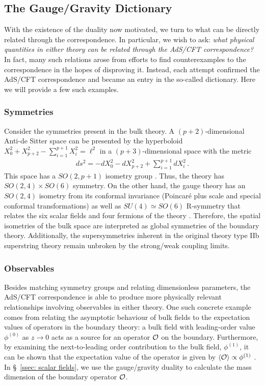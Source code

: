 \documentclass[../PhD.tex]{subfiles}
\begin{document}

\subsection{The Gauge/Gravity Dictionary}
\label{ssec: dictionary}

With the existence of the duality now motivated, we turn to what can be directly related through the correspondence. In particular, we wish to ask: \emph{what physical quantities in either theory can be related through the AdS/CFT correspondence?} In fact, many such relations arose from efforts to find counterexamples to the correspondence in the hopes of disproving it. Instead, each attempt confirmed the AdS/CFT correspondence and became an entry in the so-called dictionary. Here we will provide a few such examples.

\subsubsection*{Symmetries}
Consider the symmetries present in the \ads bulk theory. A $(p+2)$-dimensional Anti-de Sitter space can be presented by the hyperboloid $X_0^2 + X^2_{p+2} - \sum^{p+1}_{i=1} X_i^2 = \ell^2$ in a $(p+3)$-dimensional space with the metric
\begin{align}
\label{ads hyperboloid}
ds^2 = -dX_0^2 - dX_{p+2}^2 + \sum^{p+1}_{i = 1} dX^2_i \, .
\end{align}
This space has a $SO(2,p+1)$ isometry group \cite{hep-th/9905111}. Thus, the \ads theory has $SO(2,4)\times SO(6)$ symmetry. On the other hand, the gauge theory has an $SO(2,4)$ isometry from its conformal invariance (Poincar\'e plus scale and special conformal transformations) as well as $SU(4) \simeq SO(6)$ R-symmetry that relates the six scalar fields and four fermions of the theory \cite{1501.00007}. Therefore, the spatial isometries of the bulk space are interpreted as global symmetries of the boundary theory. Additionally, the supersymmetries inherent in the original theory type IIb superstring theory remain unbroken by the strong/weak coupling limits.
	
\subsubsection*{Observables}
\label{ssub: lengths}

Besides matching symmetry groups and relating dimensionless parameters, the AdS/CFT correspondence is able to produce more physically relevant relationships involving observables in either theory. One such concrete example comes from relating the asymptotic behaviour of bulk fields to the expectation values of operators in the boundary theory: a bulk field with leading-order value $\phi^{(0)}$ as $z \to 0$ acts as a source for an operator $\mathcal O$ on the boundary. Furthermore, by examining the next-to-leading order contribution to the bulk field, $\phi^{(1)}$, it can be shown that the expectation value of the operator is given by $\langle \mathcal O \rangle \propto \phi^{(1)}$ \cite{hep-th/9905104}. In \S~\!\ref{ssec: scalar fields}, we use the gauge/gravity duality to calculate the mass dimension of the boundary operator $\mathcal O$.
\end{document}
